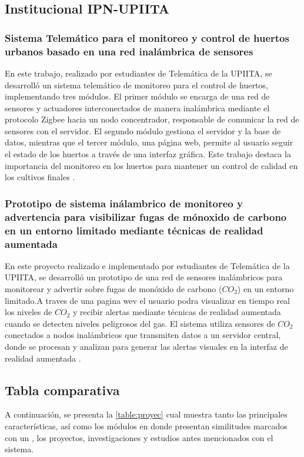 \subsection{Institucional IPN-UPIITA}
\subsubsection{Sistema Telemático para el monitoreo y control de huertos urbanos
basado en una red inalámbrica de sensores}
\label{sec:IPN1}
En este trabajo, realizado por estudiantes de Telemática de la UPIITA, 
se desarrolló un sistema telemático de monitoreo para el control de huertos, 
implementando tres módulos. El primer módulo se encarga de una red de sensores y 
actuadores interconectados de manera inalámbrica mediante el protocolo Zigbee hacia un nodo 
concentrador, responsable de comunicar la red de sensores con el servidor. El segundo módulo 
gestiona el servidor y la base de datos, mientras que el tercer módulo, una página web, permite al 
usuario seguir el estado de los huertos a través de una interfaz gráfica. Este trabajo destaca la 
importancia del monitoreo en los huertos para mantener un control de calidad en los cultivos finales \cite{Denisse2024}. 
\subsubsection{Prototipo de sistema inálambrico de monitoreo y advertencia para visibilizar fugas de mónoxido de carbono en un entorno limitado mediante técnicas de realidad aumentada}
\label{sec:IPN2}
En este proyecto realizado e implementado por estudiantes de Telemática de la UPIITA, 
se desarrolló un prototipo de una red de sensores inalámbricos para monitorear y advertir sobre
fugas de monóxido de carbono ($CO_{2}$) en un entorno limitado.A traves de una pagina wev el usuario 
podra visualizar en tiempo real los niveles de $CO_{2}$ y recibir alertas mediante técnicas de realidad aumentada
cuando se detecten niveles peligrosos del gas. El sistema utiliza sensores de $CO_{2}$ conectados a nodos inalámbricos que transmiten datos a un servidor central, 
donde se procesan y analizan para generar las alertas visuales en la interfaz de realidad aumentada \cite{DiazAvila2021}.
\newpage

\subsection{Tabla comparativa}
A continuación, se presenta la \cref{table:proyec} cual muestra tanto las principales
características, así como los módulos en donde presentan similitudes marcados con
un \checkmark, los proyectos, investigaciones y estudios antes mencionados con el sistema.


